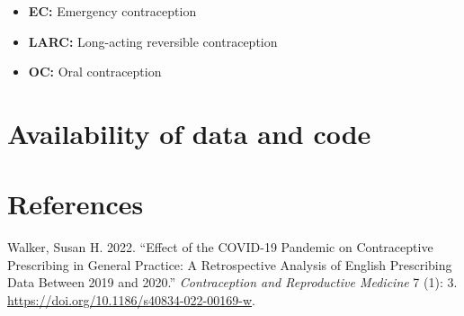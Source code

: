 \documentclass{article}
\providecommand{\tightlist}{%
  \setlength{\itemsep}{0pt}\setlength{\parskip}{0pt}}
\newlength{\cslhangindent}
\newlength{\cslentryspacingunit} %
\newenvironment{CSLReferences}[2] %
 {%
  \setlength{\parindent}{0pt}
  \ifodd #1
  \let\oldpar\par
  \def\par{\hangindent=\cslhangindent\oldpar}
  \fi
  \setlength{\parskip}{#2\cslentryspacingunit}
 }%
 {}
\begin{document}
\begin{itemize}
\tightlist
\item
  \textbf{EC:} Emergency contraception
\item
  \textbf{LARC:} Long-acting reversible contraception
\item
  \textbf{OC:} Oral contraception
\end{itemize}

\hypertarget{availability-of-data-and-code}{%
\section{Availability of data and
code}\label{availability-of-data-and-code}}

\hypertarget{references}{%
\section*{References}\label{references}}

\hypertarget{refs}{}
\begin{CSLReferences}{1}{0}
\leavevmode{}%
Walker, Susan H. 2022. {``Effect of the COVID-19 Pandemic on
Contraceptive Prescribing in General Practice: A Retrospective Analysis
of English Prescribing Data Between 2019 and 2020.''}
\emph{Contraception and Reproductive Medicine} 7 (1): 3.
\url{https://doi.org/10.1186/s40834-022-00169-w}.

\end{CSLReferences}



\end{document}
